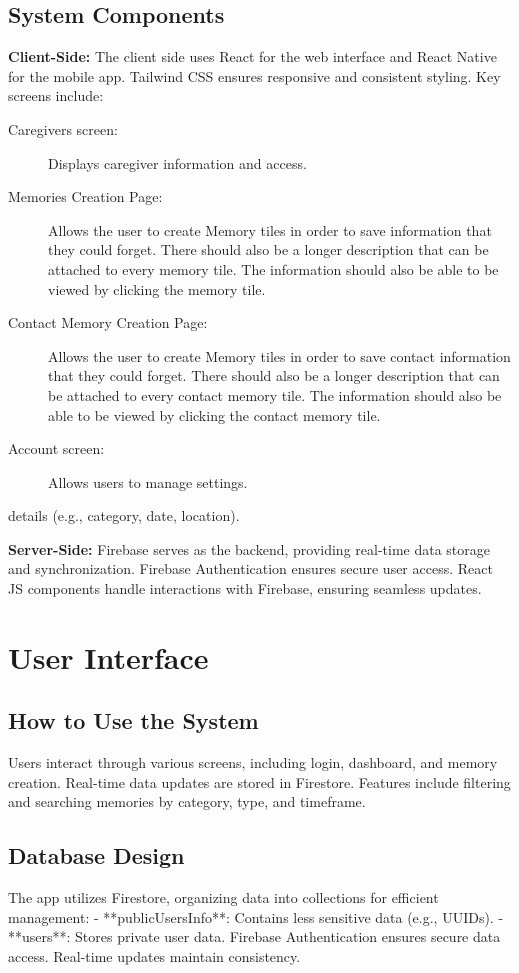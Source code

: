 \documentclass{article}
\begin{document}
\subsection{System Components}
\textbf{Client-Side:} 
The client side uses React for the web interface and React Native for the mobile app. Tailwind CSS ensures responsive and consistent styling. Key screens include:
\begin{description}
\item[Caregivers screen:] Displays caregiver information and access.
\item[Memories Creation Page:] Allows the user to create Memory tiles in order to save information that they could forget. There should also be a longer description that can be attached to every memory tile. The information should also be able to be viewed by clicking the memory tile.
\item[Contact Memory Creation Page:] Allows the user to create Memory tiles in order to save contact information that they could forget. There should also be a longer description that can be attached to every contact memory tile. The information should also be able to be viewed by clicking the contact memory tile.
\item[Account screen:] Allows users to manage settings.
\end{description} details (e.g., category, date, location).

\textbf{Server-Side:} 
Firebase serves as the backend, providing real-time data storage and synchronization. Firebase Authentication ensures secure user access. React JS components handle interactions with Firebase, ensuring seamless updates.

\section{User Interface}
\subsection{How to Use the System}
Users interact through various screens, including login, dashboard, and memory creation. Real-time data updates are stored in Firestore. Features include filtering and searching memories by category, type, and timeframe.

\subsection{Database Design}
The app utilizes Firestore, organizing data into collections for efficient management:
- **publicUsersInfo**: Contains less sensitive data (e.g., UUIDs).
- **users**: Stores private user data.
Firebase Authentication ensures secure data access. Real-time updates maintain consistency.
\end{document}
